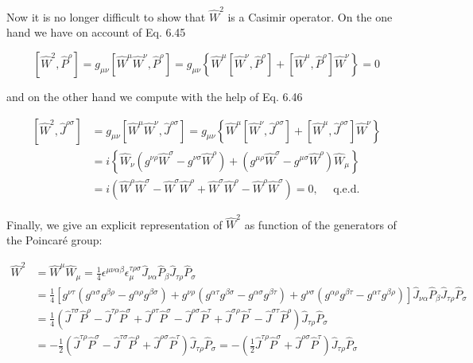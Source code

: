 \documentclass[10pt, letterpaper]{article}
\begin{document}
Now it is no longer difficult to show that $\hat{W}^{2}$ is a Casimir operator. On the one hand we have on account of Eq. 6.45

$$
\left[\hat{W}^{2}, \hat{P}^{\rho}\right]=g_{\mu \nu}\left[\hat{W}^{\mu} \hat{W}^{\nu}, \hat{P}^{\rho}\right]=g_{\mu \nu}\left\{\hat{W}^{\mu}\left[\hat{W}^{\nu}, \hat{P}^{\rho}\right]+\left[\hat{W}^{\mu}, \hat{P}^{\rho}\right] \hat{W}^{\nu}\right\}=0
$$

and on the other hand we compute with the help of Eq. 6.46

$$
\begin{aligned}
{\left[\hat{W}^{2}, \hat{J}^{\rho \sigma}\right] } & =g_{\mu \nu}\left[\hat{W}^{\mu} \hat{W}^{\nu}, \hat{J}^{\rho \sigma}\right]=g_{\mu \nu}\left\{\hat{W}^{\mu}\left[\hat{W}^{\nu}, \hat{J}^{\rho \sigma}\right]+\left[\hat{W}^{\mu}, \hat{J}^{\rho \sigma}\right] \hat{W}^{\nu}\right\} \\
& =i\left\{\hat{W}_{\nu}\left(g^{\nu \rho} \hat{W}^{\sigma}-g^{\nu \sigma} \hat{W}^{\rho}\right)+\left(g^{\mu \rho} \hat{W}^{\sigma}-g^{\mu \sigma} \hat{W}^{\rho}\right) \hat{W}_{\mu}\right\} \\
& =i\left(\hat{W}^{\rho} \hat{W}^{\sigma}-\hat{W}^{\sigma} \hat{W}^{\rho}+\hat{W}^{\sigma} \hat{W}^{\rho}-\hat{W}^{\rho} \hat{W}^{\sigma}\right)=0, \quad \text { q.e.d. }
\end{aligned}
$$

Finally, we give an explicit representation of $\hat{W}^{2}$ as function of the generators of the Poincaré group:

$$
\begin{aligned}
\hat{W}^{2} & =\hat{W}^{\mu} \hat{W}_{\mu}=\frac{1}{4} \epsilon^{\mu \nu \alpha \beta} \epsilon_{\mu}^{\tau \rho \sigma} \hat{J}_{\nu \alpha} \hat{P}_{\beta} \hat{J}_{\tau \rho} \hat{P}_{\sigma} \\
& =\frac{1}{4}\left[g^{\nu \tau}\left(g^{\alpha \sigma} g^{\beta \rho}-g^{\alpha \rho} g^{\beta \sigma}\right)+g^{\nu \rho}\left(g^{\alpha \tau} g^{\beta \sigma}-g^{\alpha \sigma} g^{\beta \tau}\right)+g^{\nu \sigma}\left(g^{\alpha \rho} g^{\beta \tau}-g^{\alpha \tau} g^{\beta \rho}\right)\right] \hat{J}_{\nu \alpha} \hat{P}_{\beta} \hat{J}_{\tau \rho} \hat{P}_{\sigma} \\
& =\frac{1}{4}\left(\hat{J}^{\tau \sigma} \hat{P}^{\rho}-\hat{J}^{\tau \rho} \hat{P}^{\sigma}+\hat{J}^{\rho \tau} \hat{P}^{\sigma}-\hat{J}^{\rho \sigma} \hat{P}^{\tau}+\hat{J}^{\sigma \rho} \hat{P}^{\tau}-\hat{J}^{\sigma \tau} \hat{P}^{\rho}\right) \hat{J}_{\tau \rho} \hat{P}_{\sigma} \\
& =-\frac{1}{2}\left(\hat{J}^{\tau \rho} \hat{P}^{\sigma}-\hat{J}^{\tau \sigma} \hat{P}^{\rho}+\hat{J}^{\rho \sigma} \hat{P}^{\tau}\right) \hat{J}_{\tau \rho} \hat{P}_{\sigma}=-\left(\frac{1}{2} \hat{J}^{\tau \rho} \hat{P}^{\sigma}+\hat{J}^{\rho \sigma} \hat{P}^{\tau}\right) \hat{J}_{\tau \rho} \hat{P}_{\sigma}
\end{aligned}
$$
\end{document}
